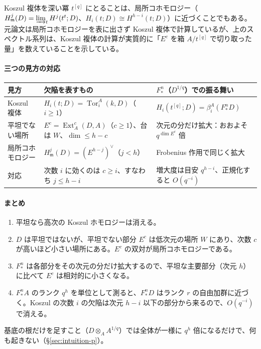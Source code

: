 \documentclass[11pt,a4paper]{ltjsarticle}
\numberwithin{equation}{section}
\theoremstyle{plain}
\theoremstyle{definition}
\theoremstyle{definition}
\newcommand{\m}{\mathfrak{m}}
\newcommand{\Tor}{\operatorname{Tor}}
\providecommand{\Ext}{\operatorname{Ext}}
\begin{document}
Koszul 複体を深い冪 $t^{[q]}$ にとることは、局所コホモロジー（$H^j_\m(D) = \varinjlim_t H^j(t^t;D)$、$H_i(t;D)\cong H^{h-i}(t;D)$）に近づくことでもある。元論文は局所コホモロジーを表に出さず Koszul 複体で計算しているが、上のスペクトル系列は、Koszul 複体の計算が実質的に「$E^c$ を箱 $A/t^{[q]}$ で切り取った量」を数えていることを示している。

\paragraph{三つの見方の対応}
\begin{center}
\small
\begin{tabularx}{\textwidth}{>{\raggedright}p{3.0cm}>{\raggedright}X>{\raggedright\arraybackslash}X}
\toprule
見方 & 欠陥を表すもの & $F^n_*$（$D^{1/q}$）での振る舞い \\
\midrule
Koszul 複体 & $H_i(t;D) = \Tor^A_i(k,D)$（$i\ge1$） & $H_i(t^{[q]};D) = \beta_i^A(F^n_*D)$ \\
平坦でない場所 & $E^c = \Ext^c_A(D,A)$（$c\ge1$）、台は $W$、$\dim\le h-c$ & 次元の分だけ拡大：おおよそ $q^{\dim E^c}$ 倍 \\
局所コホモロジー & $H^j_\m(D) = (E^{h-j})^\vee$（$j<h$） & Frobenius 作用で同じく拡大 \\
対応 & 次数 $i$ に効くのは $c\ge i$、すなわち $j\le h-i$ & 増大度は目安 $q^{h-i}$、正規化すると $O(q^{-i})$ \\
\bottomrule
\end{tabularx}
\end{center}

\paragraph{まとめ}
\begin{enumerate}
  \item 平坦なら高次の Koszul ホモロジーは消える。
  \item $D$ は平坦ではないが、平坦でない部分 $E^c$ は低次元の場所 $W$ にあり、次数 $c$ が高いほど小さい場所にある。$E^c$ の双対が局所コホモロジーである。
  \item $F^n_*$ は各部分をその次元の分だけ拡大するので、平坦な主要部分（次元 $h$）に比べて $E^c$ は相対的に小さくなる。
  \item $F^n_*A$ のランク $q^h$ を単位として測ると、$F^n_*D$ はランク $r$ の自由加群に近づく。Koszul の次数 $i$ の欠陥は次元 $h-i$ 以下の部分から来るので、$O(q^{-i})$ で消える。
\end{enumerate}
基底の根だけを足すこと（$D\otimes_A A^{1/q}$）では全体が一様に $q^h$ 倍になるだけで、何も起きない（\S\ref{sec:intuition-p}）。
\end{document}
